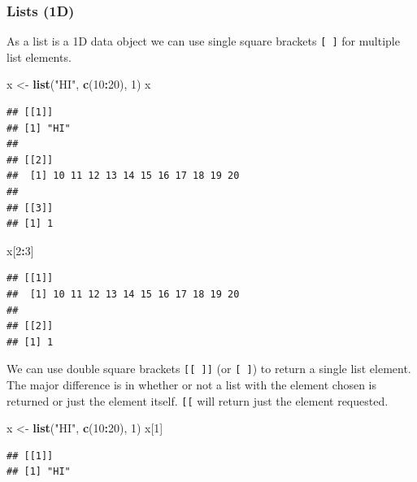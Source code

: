 \documentclass[
]{book}
\newenvironment{Shaded}{\begin{snugshade}}{\end{snugshade}}
\newcommand{\DecValTok}[1]{\textcolor[rgb]{0.00,0.00,0.81}{#1}}
\newcommand{\KeywordTok}[1]{\textcolor[rgb]{0.13,0.29,0.53}{\textbf{#1}}}
\newcommand{\NormalTok}[1]{#1}
\newcommand{\OperatorTok}[1]{\textcolor[rgb]{0.81,0.36,0.00}{\textbf{#1}}}
\newcommand{\StringTok}[1]{\textcolor[rgb]{0.31,0.60,0.02}{#1}}
\theoremstyle{definition}
\theoremstyle{definition}
\theoremstyle{definition}
\theoremstyle{remark}
\begin{document}
\hypertarget{lists-1d-1}{%
\subsubsection{Lists (1D)}\label{lists-1d-1}}

As a list is a 1D data object we can use single square brackets \texttt{{[}\ {]}} for multiple list elements.

\begin{Shaded}
\begin{Highlighting}[]
\NormalTok{x <-}\StringTok{ }\KeywordTok{list}\NormalTok{(}\StringTok{"HI"}\NormalTok{, }\KeywordTok{c}\NormalTok{(}\DecValTok{10}\OperatorTok{:}\DecValTok{20}\NormalTok{), }\DecValTok{1}\NormalTok{)}
\NormalTok{x}
\end{Highlighting}
\end{Shaded}

\begin{verbatim}
## [[1]]
## [1] "HI"
## 
## [[2]]
##  [1] 10 11 12 13 14 15 16 17 18 19 20
## 
## [[3]]
## [1] 1
\end{verbatim}

\begin{Shaded}
\begin{Highlighting}[]
\NormalTok{x[}\DecValTok{2}\OperatorTok{:}\DecValTok{3}\NormalTok{]}
\end{Highlighting}
\end{Shaded}

\begin{verbatim}
## [[1]]
##  [1] 10 11 12 13 14 15 16 17 18 19 20
## 
## [[2]]
## [1] 1
\end{verbatim}

We can use double square brackets \texttt{{[}{[}\ {]}{]}} (or \texttt{{[}\ {]}}) to return a single list element. The major difference is in whether or not a list with the element chosen is returned or just the element itself. \texttt{{[}{[}} will return just the element requested.

\begin{Shaded}
\begin{Highlighting}[]
\NormalTok{x <-}\StringTok{ }\KeywordTok{list}\NormalTok{(}\StringTok{"HI"}\NormalTok{, }\KeywordTok{c}\NormalTok{(}\DecValTok{10}\OperatorTok{:}\DecValTok{20}\NormalTok{), }\DecValTok{1}\NormalTok{)}
\NormalTok{x[}\DecValTok{1}\NormalTok{]}
\end{Highlighting}
\end{Shaded}

\begin{verbatim}
## [[1]]
## [1] "HI"
\end{verbatim}
\end{document}
